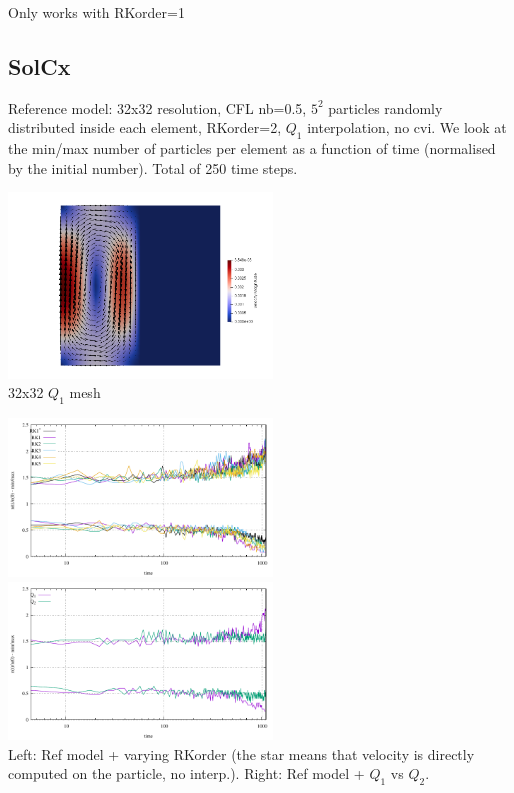 Only works with RKorder=1

\newpage
\subsection*{SolCx}

Reference model: 32x32 resolution, CFL nb=0.5, $5^2$ particles randomly distributed inside each 
element, RKorder=2, $Q_1$ interpolation, no cvi.
We look at the min/max number of particles per element as a function of time (normalised 
by the initial number). Total of 250 time steps.

\begin{center}
\includegraphics[width=7cm]{python_codes/fieldstone_30/results_solcx/vel}\\
{\captionfont 32x32 $Q_1$ mesh}
\end{center}

\begin{center}
\includegraphics[width=7cm]{python_codes/fieldstone_30/results_solcx/markercount_rk12345}
\includegraphics[width=7cm]{python_codes/fieldstone_30/results_solcx/markercount_q12}\\
{\captionfont Left: Ref model + varying RKorder (the star means that velocity 
is directly computed on the particle, no interp.). Right: Ref model + $Q_1$ vs $Q_2$. }
\end{center}


